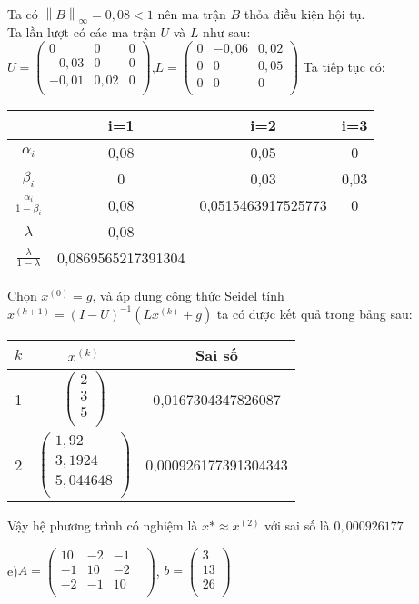 Ta có $\left\|B\right\|_{\infty}= 0,08<1$ nên ma trận $B$ thỏa điều kiện hội tụ.\\
Ta lần lượt có các ma trận $U$ và $L$ như sau:\\
$U=\begin{pmatrix}
0&0&0\\
-0,03&0&0\\
-0,01&0,02&0\\
\end{pmatrix}$,$L=\begin{pmatrix}
0&-0,06&0,02\\
0&0&0,05\\
0&0&0\\
\end{pmatrix}$
Ta tiếp tục có:\\
\begin{center} \begin{tabular}{|c|c|c|c|}\hline
&i=1&i=2&i=3\\\hline
$\alpha_i$&0,08&0,05&0\\\hline
$\beta_i$&0&0,03&0,03\\\hline
$\frac{\alpha_i}{1-\beta_i}$&0,08&0,0515463917525773&0\\\hline
$\lambda$&0,08&&\\\hline
$\frac{\lambda}{1-\lambda}$&0,0869565217391304&&\\\hline
\end{tabular}\end{center}

Chọn $x^{(0)}=g$, và áp dụng công thức Seidel tính $x^{(k+1)}=(I-U)^{-1}(Lx^{(k)}+g)$ ta có được kết quả trong bảng sau:
\begin{center} \begin{tabular}{|c|c|c|}\hline
$k$&$x^{(k)}$&Sai số\\\hline
1&$\begin{pmatrix}2\\3\\5\\\end{pmatrix}$&0,0167304347826087\\\hline
2&$\begin{pmatrix}1,92\\3,1924\\5,044648\\\end{pmatrix}$&0,000926177391304343\\\hline
\end{tabular}
\end{center}
Vậy hệ phương trình có nghiệm là $x*\approx x^{(2)}$ với sai số là $0,000926177$
\par
e)$A= \begin{pmatrix}
10&-2&-1&\\
-1&10&-2&\\
-2&-1&10&\\
\end{pmatrix}$, $b= \begin{pmatrix}
3\\
13\\
26\\
\end{pmatrix}$

